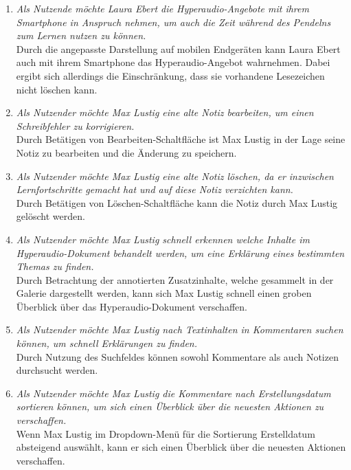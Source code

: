 \begin{enumerate}[label=US-\arabic*:,ref=US-\arabic*]
\item \label{US-Mobil-Eval} \textit{Als Nutzende möchte Laura Ebert die Hyperaudio-Angebote mit ihrem Smartphone in Anspruch nehmen, um auch die Zeit während des Pendelns zum Lernen nutzen zu können.}\\
Durch die angepasste Darstellung auf mobilen Endgeräten kann Laura Ebert auch mit ihrem Smartphone das Hyperaudio-Angebot wahrnehmen. Dabei ergibt sich allerdings die Einschränkung, dass sie vorhandene Lesezeichen nicht löschen kann.

\item \label{US-Notiz-Bearbeiten-Eval} \textit{Als Nutzender möchte Max Lustig eine alte Notiz bearbeiten, um einen Schreibfehler zu korrigieren.}\\
Durch Betätigen von \glqq Bearbeiten\grqq{}-Schaltfläche ist Max Lustig in der Lage seine Notiz zu bearbeiten und die Änderung zu speichern.

\item \label{US-Notiz-Loeschen-Eval} \textit{Als Nutzender möchte Max Lustig eine alte Notiz löschen, da er inzwischen Lernfortschritte gemacht hat und auf diese Notiz verzichten kann.}\\
Durch Betätigen von \glqq Löschen\grqq{}-Schaltfläche kann die Notiz durch Max Lustig gelöscht werden.


\item \label{US-Galerie-Eval} \textit{Als Nutzender möchte Max Lustig schnell erkennen welche Inhalte im Hyperaudio-Dokument behandelt werden, um eine Erklärung eines bestimmten Themas zu finden.}\\
Durch Betrachtung der annotierten Zusatzinhalte, welche gesammelt in der Galerie dargestellt werden, kann sich Max Lustig schnell einen groben Überblick über das Hyperaudio-Dokument verschaffen.

\item \label{US-Suche-Eval} \textit{Als Nutzender möchte Max Lustig nach Textinhalten in Kommentaren suchen können, um schnell Erklärungen zu finden.}\\
Durch Nutzung des Suchfeldes können sowohl Kommentare als auch Notizen durchsucht werden.

\item \label{US-Sortierung-Erstellungsdatum-Eval} \textit{Als Nutzender möchte Max Lustig die Kommentare nach Erstellungsdatum sortieren können, um sich einen Überblick über die neuesten Aktionen zu verschaffen.}\\
Wenn Max Lustig im Dropdown-Menü für die Sortierung \glqq Erstelldatum absteigend\grqq{} auswählt, kann er sich einen Überblick über die neuesten Aktionen verschaffen.


\end{enumerate}
